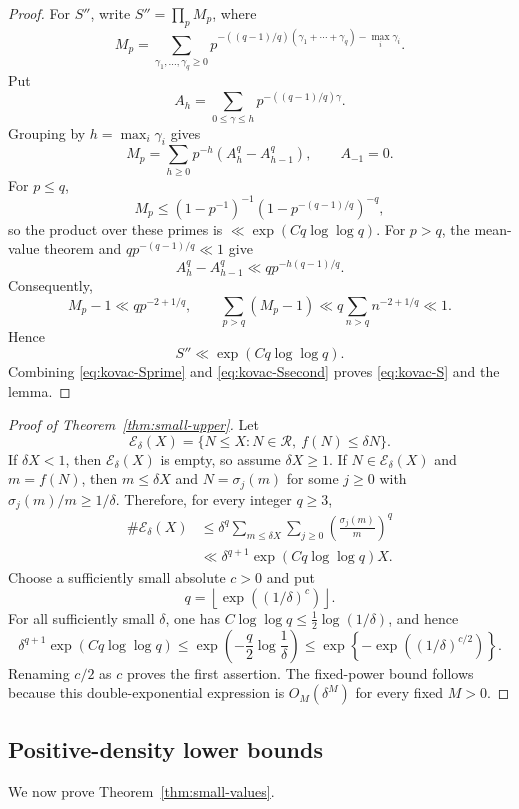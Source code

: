 \documentclass[11pt]{article}
\theoremstyle{remark}
\newcommand{\Rcal}{\mathcal R}
\newcommand{\1}{\mathbf 1}
\begin{document}
\begin{proof}
For $S''$, write $S''=\prod_pM_p$, where
\[
 M_p=\sum_{\gamma_1,\ldots,\gamma_q\geq0}
 p^{-((q-1)/q)(\gamma_1+\cdots+\gamma_q)-\max_i\gamma_i}.
\]
Put
\[
 A_h=\sum_{0\leq\gamma\leq h}p^{-((q-1)/q)\gamma}.
\]
Grouping by $h=\max_i\gamma_i$ gives
\[
 M_p=\sum_{h\geq0}p^{-h}(A_h^q-A_{h-1}^q),\qquad A_{-1}=0.
\]
For $p\leq q$,
\[
 M_p\leq(1-p^{-1})^{-1}(1-p^{-(q-1)/q})^{-q},
\]
so the product over these primes is $\ll\exp(Cq\log\log q)$.  For $p>q$,
the mean-value theorem and $qp^{-(q-1)/q}\ll1$ give
\[
 A_h^q-A_{h-1}^q\ll q p^{-h(q-1)/q}.
\]
Consequently,
\[
 M_p-1\ll q p^{-2+1/q},
\qquad
 \sum_{p>q}(M_p-1)\ll q\sum_{n>q}n^{-2+1/q}\ll1.
\]
Hence
\begin{equation}\label{eq:kovac-Ssecond}
 S''\ll\exp(Cq\log\log q).
\end{equation}
Combining \eqref{eq:kovac-Sprime} and \eqref{eq:kovac-Ssecond} proves
\eqref{eq:kovac-S} and the lemma.
\end{proof}

\begin{proof}[Proof of Theorem~\ref{thm:small-upper}]
Let
\[
 \mathcal E_\delta(X)=
 \{N\leq X:N\in\Rcal,\ f(N)\leq\delta N\}.
\]
If $\delta X<1$, then $\mathcal E_\delta(X)$ is empty, so assume
$\delta X\geq1$.  If $N\in\mathcal E_\delta(X)$ and $m=f(N)$, then
$m\leq\delta X$ and $N=\sigma_j(m)$ for some $j\geq0$ with
$\sigma_j(m)/m\geq1/\delta$.  Therefore, for every integer $q\geq3$,
\begin{align*}
 \#\mathcal E_\delta(X)
 &\leq\delta^q\sum_{m\leq\delta X}\sum_{j\geq0}
       \left(\frac{\sigma_j(m)}m\right)^q\\
 &\ll\delta^{q+1}\exp(Cq\log\log q)X.
\end{align*}
Choose a sufficiently small absolute $c>0$ and put
\[
 q=\left\lfloor\exp((1/\delta)^c)\right\rfloor.
\]
For all sufficiently small $\delta$, one has
$C\log\log q\leq\tfrac12\log(1/\delta)$, and hence
\[
 \delta^{q+1}\exp(Cq\log\log q)
 \leq\exp\!\left(-\frac q2\log\frac1\delta\right)
 \leq\exp\!\left\{-\exp((1/\delta)^{c/2})\right\}.
\]
Renaming $c/2$ as $c$ proves the first assertion.  The fixed-power bound
follows because this double-exponential expression is $O_M(\delta^M)$ for
every fixed $M>0$.
\end{proof}

\subsection{Positive-density lower bounds}

We now prove Theorem~\ref{thm:small-values}.
\end{document}

